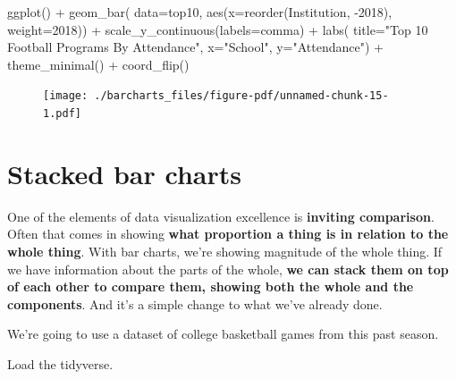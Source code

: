 \documentclass[
  letterpaper,
  DIV=11,
  numbers=noendperiod]{scrreprt}
\newenvironment{Shaded}{\begin{snugshade}}{\end{snugshade}}
\newcommand{\AttributeTok}[1]{\textcolor[rgb]{0.40,0.45,0.13}{#1}}
\newcommand{\FunctionTok}[1]{\textcolor[rgb]{0.28,0.35,0.67}{#1}}
\newcommand{\NormalTok}[1]{\textcolor[rgb]{0.00,0.23,0.31}{#1}}
\newcommand{\SpecialCharTok}[1]{\textcolor[rgb]{0.37,0.37,0.37}{#1}}
\newcommand{\StringTok}[1]{\textcolor[rgb]{0.13,0.47,0.30}{#1}}
\begin{document}
\begin{Shaded}
\begin{Highlighting}[]
\FunctionTok{ggplot}\NormalTok{() }\SpecialCharTok{+} 
  \FunctionTok{geom\_bar}\NormalTok{(}
    \AttributeTok{data=}\NormalTok{top10, }
    \FunctionTok{aes}\NormalTok{(}\AttributeTok{x=}\FunctionTok{reorder}\NormalTok{(Institution, }\SpecialCharTok{{-}}\StringTok{\textasciigrave{}}\AttributeTok{2018}\StringTok{\textasciigrave{}}\NormalTok{),}
        \AttributeTok{weight=}\StringTok{\textasciigrave{}}\AttributeTok{2018}\StringTok{\textasciigrave{}}\NormalTok{)) }\SpecialCharTok{+} 
  \FunctionTok{scale\_y\_continuous}\NormalTok{(}\AttributeTok{labels=}\NormalTok{comma) }\SpecialCharTok{+} 
  \FunctionTok{labs}\NormalTok{(}
    \AttributeTok{title=}\StringTok{"Top 10 Football Programs By Attendance"}\NormalTok{, }
    \AttributeTok{x=}\StringTok{"School"}\NormalTok{, }
    \AttributeTok{y=}\StringTok{"Attendance"}\NormalTok{) }\SpecialCharTok{+} 
  \FunctionTok{theme\_minimal}\NormalTok{() }\SpecialCharTok{+} 
  \FunctionTok{coord\_flip}\NormalTok{()}
\end{Highlighting}
\end{Shaded}

\begin{figure}[H]

{\centering \texttt{[image: ./barcharts\_files/figure-pdf/unnamed-chunk-15-1.pdf]}

}

\end{figure}


\hypertarget{stacked-bar-charts}{%
\chapter{Stacked bar charts}\label{stacked-bar-charts}}

One of the elements of data visualization excellence is \textbf{inviting
comparison}. Often that comes in showing \textbf{what proportion a thing
is in relation to the whole thing}. With bar charts, we're showing
magnitude of the whole thing. If we have information about the parts of
the whole, \textbf{we can stack them on top of each other to compare
them, showing both the whole and the components}. And it's a simple
change to what we've already done.

We're going to use a dataset of college basketball games from this past
season.

Load the tidyverse.
\end{document}
